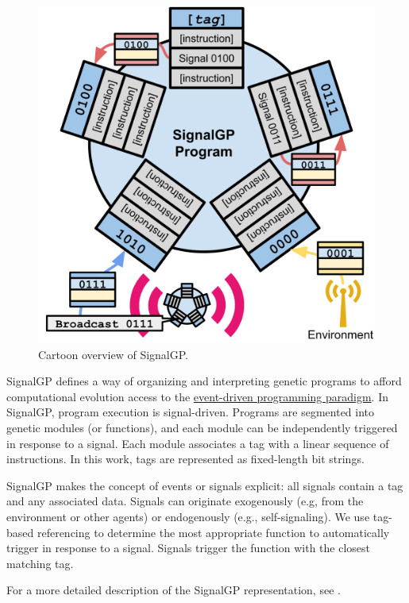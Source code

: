 \documentclass[
]{book}
\begin{document}
\begin{figure}
\centering
\includegraphics{./media/sgp-cartoon.png}
\caption{Cartoon overview of SignalGP.}
\end{figure}

SignalGP defines a way of organizing and interpreting genetic programs to afford computational evolution access to the \href{https://en.wikipedia.org/wiki/Event-driven_programming}{event-driven programming paradigm}.
In SignalGP, program execution is signal-driven.
Programs are segmented into genetic modules (or functions), and each module can be independently triggered in response to a signal.
Each module associates a tag with a linear sequence of instructions.
In this work, tags are represented as fixed-length bit strings.

SignalGP makes the concept of events or signals explicit: all signals contain a tag and any associated
data.
Signals can originate exogenously (e.g, from the environment or other agents) or endogenously (e.g., self-signaling).
We use tag-based referencing to determine the most appropriate function to automatically trigger in
response to a signal.
Signals trigger the function with the closest matching tag.

For a more detailed description of the SignalGP representation, see \citep{lalejini_evolving_2018}.
\end{document}

